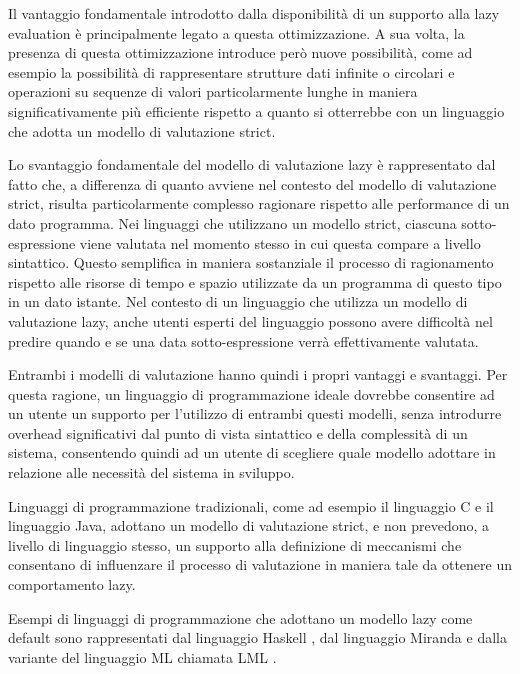 Il vantaggio fondamentale introdotto dalla disponibilità di un supporto alla lazy
evaluation è principalmente legato a questa ottimizzazione. A sua volta, la
presenza di questa ottimizzazione introduce però nuove possibilità, come ad
esempio la possibilità di rappresentare strutture dati infinite o circolari e
operazioni su sequenze di valori particolarmente lunghe in maniera
significativamente più efficiente rispetto a quanto si otterrebbe con un
linguaggio che adotta un modello di valutazione strict.

Lo svantaggio fondamentale del modello di valutazione lazy è rappresentato dal
fatto che, a differenza di quanto avviene nel contesto del modello di
valutazione strict, risulta particolarmente complesso ragionare rispetto alle
performance di un dato programma. Nei linguaggi che utilizzano un modello
strict, ciascuna sotto-espressione viene valutata nel momento stesso in cui
questa compare a livello sintattico. Questo semplifica in maniera sostanziale il
processo di ragionamento rispetto alle risorse di tempo e spazio utilizzate da
un programma di questo tipo in un dato istante. Nel contesto di un linguaggio
che utilizza un modello di valutazione lazy, anche utenti esperti del linguaggio
possono avere difficoltà nel predire quando e se una data sotto-espressione
verrà effettivamente valutata.

Entrambi i modelli di valutazione hanno quindi i propri vantaggi e svantaggi.
Per questa ragione, un linguaggio di programmazione ideale dovrebbe consentire
ad un utente un supporto per l'utilizzo di entrambi questi modelli, senza
introdurre overhead significativi dal punto di vista sintattico e della
complessità di un sistema, consentendo quindi ad un utente di scegliere quale
modello adottare in relazione alle necessità del sistema in sviluppo.

Linguaggi di programmazione tradizionali, come ad esempio il linguaggio C e il
linguaggio Java, adottano un modello di valutazione strict, e non prevedono, a
livello di linguaggio stesso, un supporto alla definizione di meccanismi che
consentano di influenzare il processo di valutazione in maniera tale da ottenere
un comportamento lazy.

Esempi di linguaggi di programmazione che adottano un modello lazy come default
sono rappresentati dal linguaggio Haskell \cite{DBLP:conf/hopl/HudakHJW07}, dal
linguaggio Miranda \cite{DBLP:journals/eatcs/Turner87} e dalla variante del
linguaggio ML chiamata LML \cite{DBLP:conf/lfp/Augustsson84}.

